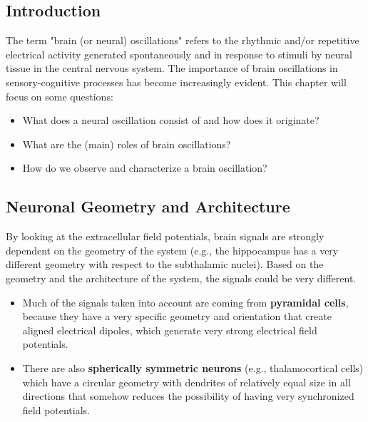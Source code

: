\subsection{Introduction}
The term "brain (or neural) oscillations" refers to the rhythmic and/or repetitive electrical 
activity generated spontaneously and in response to stimuli by neural tissue in the central 
nervous system. The importance of brain oscillations in sensory-cognitive processes has become 
increasingly evident. This chapter will focus on some questions:
\begin{itemize}
    \item What does a neural oscillation consist of and how does it originate?
    \item What are the (main) roles of brain oscillations?
    \item How do we observe and characterize a brain oscillation?
\end{itemize}

\subsection{Neuronal Geometry and Architecture}
By looking at the extracellular field potentials, brain signals are strongly dependent on the 
geometry of the system (e.g., the hippocampus has a very different geometry with respect to 
the subthalamic nuclei). Based on the geometry and the architecture of the system, the signals 
could be very different.
\begin{itemize}
    \item Much of the signals taken into account are coming from \textbf{pyramidal cells}, because they have a very 
    specific geometry and orientation that create aligned electrical dipoles, which generate very strong 
    electrical field potentials.
    \item There are also \textbf{spherically symmetric neurons} (e.g., thalamocortical cells) which have a circular 
    geometry with dendrites of relatively equal size in all directions that somehow reduces the possibility of 
    having very synchronized field potentials.
\end{itemize}

